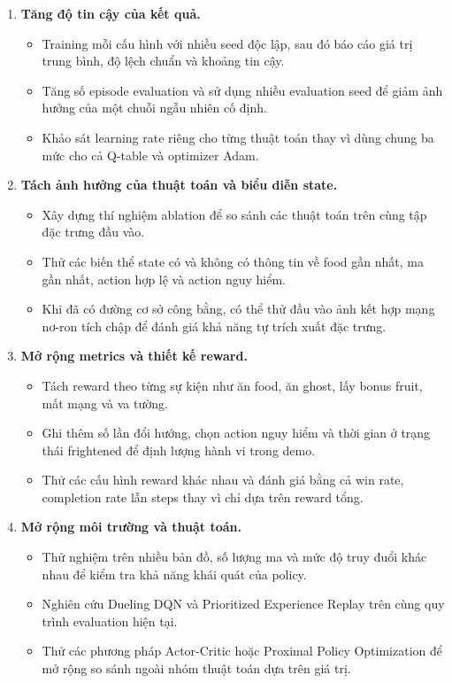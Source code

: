 \begin{enumerate}
    \item \textbf{Tăng độ tin cậy của kết quả.}
    \begin{itemize}
        \item Training mỗi cấu hình với nhiều seed độc lập, sau đó báo cáo giá trị trung bình, độ lệch chuẩn và khoảng tin cậy.
        \item Tăng số episode evaluation và sử dụng nhiều evaluation seed để giảm ảnh hưởng của một chuỗi ngẫu nhiên cố định.
        \item Khảo sát learning rate riêng cho từng thuật toán thay vì dùng chung ba mức cho cả Q-table và optimizer Adam.
    \end{itemize}

    \item \textbf{Tách ảnh hưởng của thuật toán và biểu diễn state.}
    \begin{itemize}
        \item Xây dựng thí nghiệm ablation để so sánh các thuật toán trên cùng tập đặc trưng đầu vào.
        \item Thử các biến thể state có và không có thông tin về food gần nhất, ma gần nhất, action hợp lệ và action nguy hiểm.
        \item Khi đã có đường cơ sở công bằng, có thể thử đầu vào ảnh kết hợp mạng nơ-ron tích chập để đánh giá khả năng tự trích xuất đặc trưng.
    \end{itemize}

    \item \textbf{Mở rộng metrics và thiết kế reward.}
    \begin{itemize}
        \item Tách reward theo từng sự kiện như ăn food, ăn ghost, lấy bonus fruit, mất mạng và va tường.
        \item Ghi thêm số lần đổi hướng, chọn action nguy hiểm và thời gian ở trạng thái frightened để định lượng hành vi trong demo.
        \item Thử các cấu hình reward khác nhau và đánh giá bằng cả win rate, completion rate lẫn steps thay vì chỉ dựa trên reward tổng.
    \end{itemize}

    \item \textbf{Mở rộng môi trường và thuật toán.}
    \begin{itemize}
        \item Thử nghiệm trên nhiều bản đồ, số lượng ma và mức độ truy đuổi khác nhau để kiểm tra khả năng khái quát của policy.
        \item Nghiên cứu Dueling DQN và Prioritized Experience Replay trên cùng quy trình evaluation hiện tại.
        \item Thử các phương pháp Actor-Critic hoặc Proximal Policy Optimization để mở rộng so sánh ngoài nhóm thuật toán dựa trên giá trị.
    \end{itemize}
\end{enumerate}
